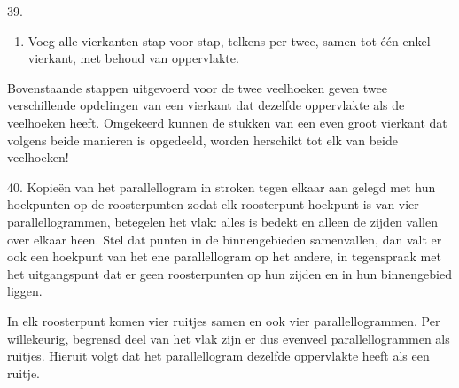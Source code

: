 \begin{problem}{39.}
\begin{enumerate}
        \item Voeg alle vierkanten stap voor stap, telkens per twee, samen tot één enkel vierkant, met behoud van oppervlakte.

    \end{enumerate}

    Bovenstaande stappen uitgevoerd voor de twee veelhoeken geven twee verschillende opdelingen van een vierkant dat dezelfde opper\-vlakte als de veelhoeken heeft. Omgekeerd kunnen de stukken van een even groot vierkant dat volgens beide manieren is opgedeeld, worden herschikt tot elk van beide veelhoeken!
\end{problem}

\clearpage

\begin{problem}{40.}
    Kopieën van het parallellogram in stroken tegen elkaar aan ge\-legd met hun hoekpunten op de roosterpunten zodat elk roosterpunt hoekpunt is van vier parallellogrammen, betegelen het vlak: alles is bedekt en alleen de zijden vallen over elkaar heen. Stel dat punten in de binnengebieden samenvallen, dan valt er ook een hoekpunt van het ene parallellogram op het andere, in tegenspraak met het uitgangspunt dat er geen roosterpunten op hun zijden en in hun binnengebied liggen.

    In elk roosterpunt komen vier ruitjes samen en ook vier parallel\-logrammen. Per willekeurig, begrensd deel van het vlak zijn er dus evenveel parallellogrammen als ruitjes. Hieruit volgt dat het parallel\-logram dezelfde oppervlakte heeft als een ruitje.
\end{problem}

